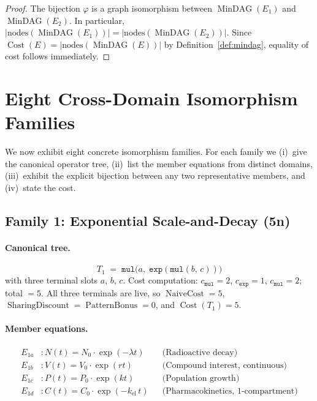 \documentclass[12pt,a4paper]{article}
\theoremstyle{definition}
\newcommand{\Cost}{\operatorname{Cost}}
\newcommand{\NC}{\operatorname{NaiveCost}}
\newcommand{\SD}{\operatorname{SharingDiscount}}
\newcommand{\PB}{\operatorname{PatternBonus}}
\newcommand{\MinDAG}{\operatorname{MinDAG}}
\newcommand{\mexp}{\mathtt{exp}}
\newcommand{\mmul}{\mathtt{mul}}
\begin{document}
\begin{proof}
The bijection $\varphi$ is a graph isomorphism between $\MinDAG(E_1)$ and
$\MinDAG(E_2)$.  In particular, $|\mathrm{nodes}(\MinDAG(E_1))| =
|\mathrm{nodes}(\MinDAG(E_2))|$.  Since $\Cost(E) = |\mathrm{nodes}(\MinDAG(E))|$
by Definition~\ref{def:mindag}, equality of cost follows immediately.
\end{proof}

\section{Eight Cross-Domain Isomorphism Families}
\label{sec:families}

We now exhibit eight concrete isomorphism families.  For each family we
(i)~give the canonical operator tree, (ii)~list the member equations from
distinct domains, (iii)~exhibit the explicit bijection between any two
representative members, and (iv)~state the cost.

\subsection{Family 1: Exponential Scale-and-Decay (5n)}
\label{sec:fam1}

\paragraph{Canonical tree.}
\begin{equation}
\label{eq:fam1-tree}
  T_1 \;=\; \mmul\!\bigl(a,\; \mexp(\mmul(b,\, c))\bigr)
\end{equation}
with three terminal slots $a$, $b$, $c$.  Cost computation:
$c_{\mmul} = 2$, $c_{\mexp} = 1$, $c_{\mmul} = 2$; total $= 5$.
All three terminals are live, so $\NC = 5$, $\SD = \PB = 0$, and
$\Cost(T_1) = 5$.

\paragraph{Member equations.}
\begin{align*}
  E_{1a} &: N(t) = N_0 \cdot \exp(-\lambda t)
            && \text{(Radioactive decay)} \\
  E_{1b} &: V(t) = V_0 \cdot \exp(r t)
            && \text{(Compound interest, continuous)} \\
  E_{1c} &: P(t) = P_0 \cdot \exp(k t)
            && \text{(Population growth)} \\
  E_{1d} &: C(t) = C_0 \cdot \exp(-k_{\mathrm{el}}\, t)
            && \text{(Pharmacokinetics, 1-compartment)}
\end{align*}
\end{document}
